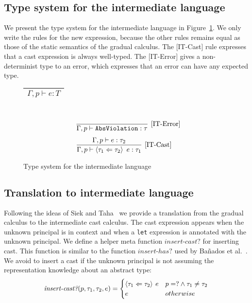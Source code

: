 \documentclass{article}
\newcommand{\cast}[2]{\left\langle #1 \Leftarrow #2 \right\rangle}
\newcommand\icode[1]{\texttt{#1}}
\newcommand\rulename[1]{\mathrm{\text{[#1]}}}
\newcommand\irname[1]{[#1]}
\begin{document}
\subsection{Type system for the intermediate language}
We present the type system for the intermediate language in Figure~\ref{fig:type_system_il}. We only write the rules for the new expression, because the other rules remains equal as those of the static semantics of the gradual calculus. The \irname{IT-Cast} rule expresses that a cast expression is always well-typed. The \irname{IT-Error} gives a non-determinist type to an error, which expresses that an error can have any expected type. 
\begin{figure}[!htbp]
\begin{tabular}{|c|} 
 \hline
  $\Gamma, p \vdash e : T$  \\
 \hline
\end{tabular} \\
\[
\begin{tabular}{c}
\infer[\rulename{IT-Error}] 
{\Gamma, p \vdash \icode{AbsViolation} : \tau}
{}
\end{tabular}
\]
\[
\begin{tabular}{c c}
\infer[\rulename{IT-Cast}] 
{\Gamma, p \vdash \cast{\tau_1}{\tau_2}~e : \tau_1}
{\Gamma, p \vdash e : \tau_2} &
\end{tabular}
\]

\caption{Type system for the intermediate language}
\label{fig:type_system_il}
\end{figure}
\subsection{Translation to intermediate language}\label{sec:translation}

Following the ideas of Siek and Taha~\cite{siekTaha:sfp2006} we provide a translation from the gradual calculus to the intermediate cast calculus. The cast expression appears when the unknown principal is in context and when a \icode{let} expression is annotated with the unknown principal. We define a helper meta function $insert\text{-}cast?$ for inserting cast. This function is similar to the function $insert\text{-}has?$ used by Ba{\~n}ados et al.~\cite{banadosAl:icfp2014}. We avoid to insert a cast if the unknown principal is not assuming the representation knowledge about an abstract type:
\[
\begin{tabular}{c}
$\textit{insert-cast?}(p, \tau_1, \tau_2, e) =  
\begin{cases} 
      \cast{\tau_1}{\tau_2} \: e & p = ? \land \tau_1 \neq \tau_2 \\      
      e &  otherwise
\end{cases}$
\end{tabular}
\]
\end{document}
